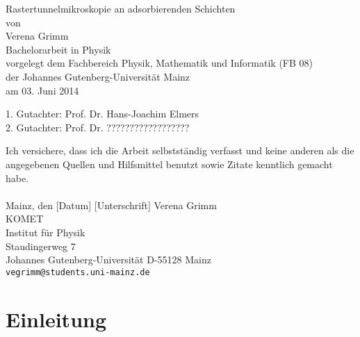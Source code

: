 \documentclass[a4paper,11pt,oneside,final,german,openbib,pdftex]{scrbook}
\begin{document}

\begin{titlepage}
  \vspace*{6mm}
  \begin{center}
     {\afont Rastertunnelmikroskopie an adsorbierenden Schichten}
     \\[3.5cm]
     {\large von}
     \\[3.5cm]
     {\dfont Verena Grimm}
     \\[2cm]
     {\large Bachelorarbeit in Physik \/\\
        vorgelegt dem Fachbereich Physik, Mathematik und Informatik (FB 08) \/\\
        der Johannes Gutenberg-Universit\"at Mainz \/\\
        am 03. Juni 2014}
   \end{center}
   \vfill
   1. Gutachter: Prof. Dr. Hans-Joachim Elmers\\	
   2. Gutachter: Prof. Dr. ?????????????????? \\
   \vfill
\end{titlepage}

\thispagestyle{empty}
Ich versichere, dass ich die Arbeit selbstst\"andig verfasst und keine 
anderen als die angegebenen Quellen und Hilfsmittel benutzt sowie 
Zitate kenntlich gemacht habe.
\\
\\[3.5cm] 
Mainz, den [Datum] [Unterschrift]
\vfill
\noindent 
Verena Grimm\\
KOMET\\
Institut f\"ur Physik\\
Staudingerweg 7\\
Johannes Gutenberg-Universit\"at
D-55128 Mainz\\
{\tt vegrimm@students.uni-mainz.de}

\renewcommand\contentsname{Inhaltsverzeichnis}
\renewcommand\figurename{Abbildung}
\renewcommand\tablename{Tabelle}
\tableofcontents
\clearpage 

\mainmatter  
\sloppy

\chapter{Einleitung}
\end{document}
